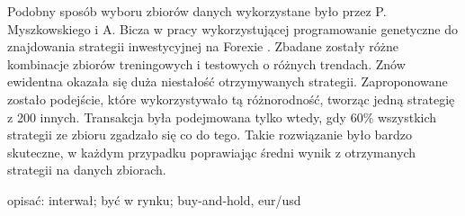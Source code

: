\documentclass[twoside]{iisthesis}
\begin{document}
Podobny sposób wyboru zbiorów danych wykorzystane było przez P. Myszkowskiego i A. Bicza w pracy wykorzystującej programowanie genetyczne do znajdowania strategii inwestycyjnej na Forexie \cite{Bicz}. Zbadane zostały różne kombinacje zbiorów treningowych i testowych o różnych trendach. Znów ewidentna okazała się duża niestałość otrzymywanych strategii. Zaproponowane zostało podejście, które wykorzystywało tą różnorodność, tworząc jedną strategię z 200 innych. Transakcja była podejmowana tylko wtedy, gdy 60\% wszystkich strategii ze zbioru zgadzało się co do tego. Takie rozwiązanie było bardzo skuteczne, w każdym przypadku poprawiając średni wynik z otrzymanych strategii na danych zbiorach.
















opisać: interwał; być w rynku; buy-and-hold, eur/usd















\end{document}
